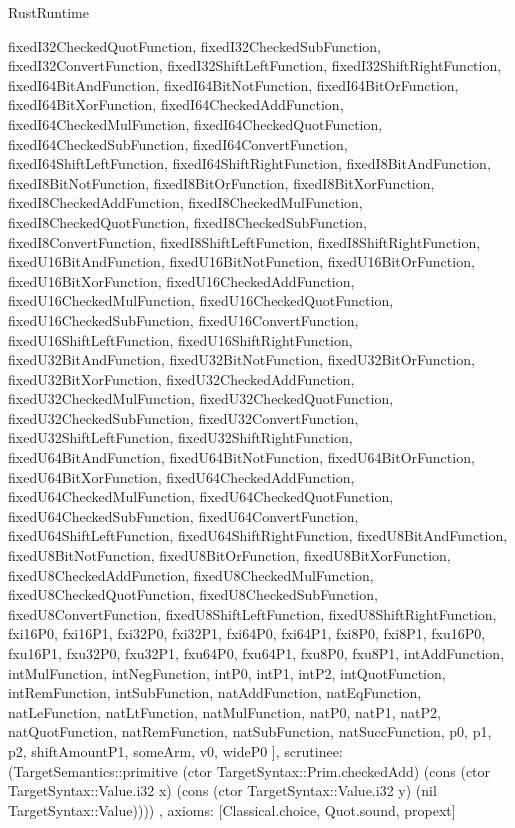 \begin{lexlean}{RustRuntime}
\begin{semanticmodule}
{{      fixedI32CheckedQuotFunction,
      fixedI32CheckedSubFunction,
      fixedI32ConvertFunction,
      fixedI32ShiftLeftFunction,
      fixedI32ShiftRightFunction,
      fixedI64BitAndFunction,
      fixedI64BitNotFunction,
      fixedI64BitOrFunction,
      fixedI64BitXorFunction,
      fixedI64CheckedAddFunction,
      fixedI64CheckedMulFunction,
      fixedI64CheckedQuotFunction,
      fixedI64CheckedSubFunction,
      fixedI64ConvertFunction,
      fixedI64ShiftLeftFunction,
      fixedI64ShiftRightFunction,
      fixedI8BitAndFunction,
      fixedI8BitNotFunction,
      fixedI8BitOrFunction,
      fixedI8BitXorFunction,
      fixedI8CheckedAddFunction,
      fixedI8CheckedMulFunction,
      fixedI8CheckedQuotFunction,
      fixedI8CheckedSubFunction,
      fixedI8ConvertFunction,
      fixedI8ShiftLeftFunction,
      fixedI8ShiftRightFunction,
      fixedU16BitAndFunction,
      fixedU16BitNotFunction,
      fixedU16BitOrFunction,
      fixedU16BitXorFunction,
      fixedU16CheckedAddFunction,
      fixedU16CheckedMulFunction,
      fixedU16CheckedQuotFunction,
      fixedU16CheckedSubFunction,
      fixedU16ConvertFunction,
      fixedU16ShiftLeftFunction,
      fixedU16ShiftRightFunction,
      fixedU32BitAndFunction,
      fixedU32BitNotFunction,
      fixedU32BitOrFunction,
      fixedU32BitXorFunction,
      fixedU32CheckedAddFunction,
      fixedU32CheckedMulFunction,
      fixedU32CheckedQuotFunction,
      fixedU32CheckedSubFunction,
      fixedU32ConvertFunction,
      fixedU32ShiftLeftFunction,
      fixedU32ShiftRightFunction,
      fixedU64BitAndFunction,
      fixedU64BitNotFunction,
      fixedU64BitOrFunction,
      fixedU64BitXorFunction,
      fixedU64CheckedAddFunction,
      fixedU64CheckedMulFunction,
      fixedU64CheckedQuotFunction,
      fixedU64CheckedSubFunction,
      fixedU64ConvertFunction,
      fixedU64ShiftLeftFunction,
      fixedU64ShiftRightFunction,
      fixedU8BitAndFunction,
      fixedU8BitNotFunction,
      fixedU8BitOrFunction,
      fixedU8BitXorFunction,
      fixedU8CheckedAddFunction,
      fixedU8CheckedMulFunction,
      fixedU8CheckedQuotFunction,
      fixedU8CheckedSubFunction,
      fixedU8ConvertFunction,
      fixedU8ShiftLeftFunction,
      fixedU8ShiftRightFunction,
      fxi16P0,
      fxi16P1,
      fxi32P0,
      fxi32P1,
      fxi64P0,
      fxi64P1,
      fxi8P0,
      fxi8P1,
      fxu16P0,
      fxu16P1,
      fxu32P0,
      fxu32P1,
      fxu64P0,
      fxu64P1,
      fxu8P0,
      fxu8P1,
      intAddFunction,
      intMulFunction,
      intNegFunction,
      intP0,
      intP1,
      intP2,
      intQuotFunction,
      intRemFunction,
      intSubFunction,
      natAddFunction,
      natEqFunction,
      natLeFunction,
      natLtFunction,
      natMulFunction,
      natP0,
      natP1,
      natP2,
      natQuotFunction,
      natRemFunction,
      natSubFunction,
      natSuccFunction,
      p0,
      p1,
      p2,
      shiftAmountP1,
      someArm,
      v0,
      wideP0
    ],
    scrutinee: (TargetSemantics::primitive (ctor TargetSyntax::Prim.checkedAdd) (cons (ctor TargetSyntax::Value.i32 x) (cons (ctor TargetSyntax::Value.i32 y) (nil TargetSyntax::Value))))
  },
  axioms: [Classical.choice, Quot.sound, propext]
}


\end{semanticmodule}
\end{lexlean}
